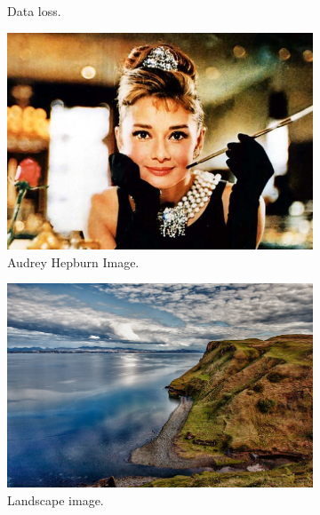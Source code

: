 \documentclass[abstracton]{scrreprt}
\begin{document}
\begin{figure}[!ht]
\begin{subfigure}[b]{0.24\textwidth}
                    \caption{Data loss.}
                \end{subfigure}
                \begin{subfigure}[b]{0.4\textwidth}
                    \includegraphics[width=\textwidth]{img/images/hepburn.png}
                    \caption{Audrey Hepburn Image.}
                \end{subfigure}
                \begin{subfigure}[b]{0.425\textwidth}
                    \includegraphics[width=\textwidth]{img/images/landscape.png}
                    \caption{Landscape image.}
                \end{subfigure}
                \begin{subfigure}[b]{0.3\textwidth}

\end{subfigure}
\end{figure}
\end{document}

